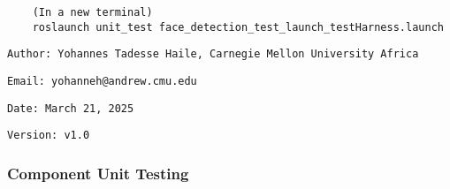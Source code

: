 \documentclass{CSSRforAfrica}
\newcommand{\checkboxChecked}{\fbox{\ding{51}}} %
\begin{document}
\begin{description}
{\begin{verbatim}
    (In a new terminal)
    roslaunch unit_test face_detection_test_launch_testHarness.launch
\end{verbatim}}

\item[\checkboxChecked] 
 {\small 
\begin{verbatim}
Author: Yohannes Tadesse Haile, Carnegie Mellon University Africa
\end{verbatim}}

\item[\checkboxChecked] 
 {\small 
\begin{verbatim}
Email: yohanneh@andrew.cmu.edu
\end{verbatim}}

\item[\checkboxChecked] 
 {\small 
\begin{verbatim}
Date: March 21, 2025
\end{verbatim}}

\item[\checkboxChecked] 
 {\small 
\begin{verbatim}
Version: v1.0
\end{verbatim}}


\end{description}

\subsubsection{Component Unit Testing}
\label{subsubsection:face_detection_test_unit_testing}
\end{document}
